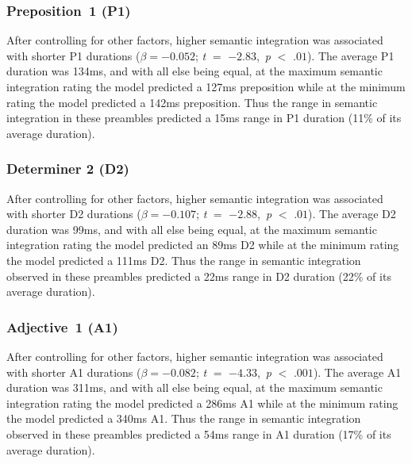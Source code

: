 \documentclass[12pt,titlepage]{article}
\begin{document}




\subsubsection{Preposition~1 (P1)} After controlling for other factors, higher semantic integration was associated with shorter P1 durations ($\beta = - 0.052$; \textit{t} $=$ $-2.83$,~\textit{p} $<$ $.01$). The average P1 duration was 134ms, and with all else being equal, at the maximum semantic integration rating the model predicted a 127ms preposition while at the minimum rating the model predicted a 142ms preposition. Thus the range in semantic integration in these preambles predicted a 15ms range in P1 duration (11\% of its average duration).


\subsubsection{Determiner 2 (D2)}  After controlling for other factors, higher semantic integration was associated with shorter D2 durations ($\beta = - 0.107$; \textit{t} $=$ $-2.88$,~\textit{p} $<$ $.01$). The average D2 duration was 99ms, and with all else being equal, at the maximum semantic integration rating the model predicted an 89ms D2 while at the minimum rating the model predicted a 111ms D2. Thus the range in semantic integration observed in these preambles predicted a 22ms range in D2 duration (22\% of its average duration).


\subsubsection{Adjective~1 (A1)} After controlling for other factors, higher semantic integration was associated with shorter A1 durations ($\beta = - 0.082$; \textit{t} $=$ $-4.33$,~\textit{p} $<$ $.001$). The average A1 duration was 311ms, and with all else being equal, at the maximum semantic integration rating the model predicted a 286ms A1 while at the minimum rating the model predicted a 340ms A1. Thus the range in semantic integration observed in these preambles predicted a 54ms range in A1 duration (17\% of its average duration).
\end{document}
